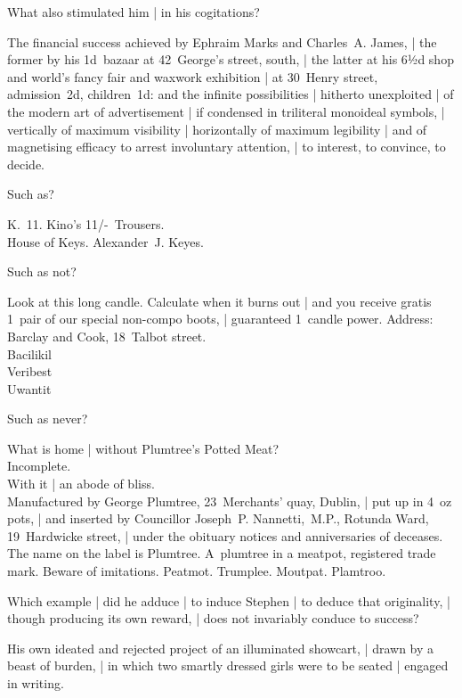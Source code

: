 What also stimulated him |
in his cogitations?

\Adverts
The financial success achieved by Ephraim Marks and Charles~A. James, |
the former by his 1d~bazaar at 42~George's street, south, |
the latter at his 6½d shop and world's fancy fair and waxwork exhibition |
at 30~Henry street, admission~2d, children~1d:
and the infinite possibilities |
hitherto unexploited |
of the modern art of advertisement |
if condensed in triliteral monoideal symbols, |
vertically of maximum visibility
 |
horizontally of maximum legibility
 |
and of magnetising efficacy to arrest involuntary attention, |
to interest,
to convince,
to decide.


Such as?

\Adverts
K.~11. Kino's 11/-~Trousers.\\
House of Keys. Alexander~J. Keyes.


Such as not?

\Adverts
Look at this long candle.
Calculate when it burns out |
and you receive gratis 1~pair of our special non-compo boots, |
guaranteed 1~candle power.
Address:
Barclay and Cook, 18~Talbot street.\\
Bacilikil
\\
Veribest
\\
Uwantit


Such as never?

\Adverts
What is home |
without Plumtree's Potted Meat?\\
Incomplete.\\
With it |
an abode of bliss.\\
Manufactured by George Plumtree, 23~Merchants' quay, Dublin, |
put up in 4~oz pots, |
and inserted by
Councillor Joseph~P. Nannetti,~M.P., Rotunda Ward, 19~Hardwicke street, |
under the obituary notices and anniversaries of deceases.
The name on the label is Plumtree.
A~plumtree in a meatpot,
registered trade mark.
Beware of imitations.
Peatmot.
Trumplee.
Moutpat.
Plamtroo.


Which example |
did he adduce |
to induce Stephen |
to deduce that originality, |
though producing its own reward, |
does not invariably conduce to success?

\Memories
His own ideated and rejected project of an illuminated showcart, |
drawn by a beast of burden, |
in which two smartly dressed girls were to be seated |
engaged in writing.%


